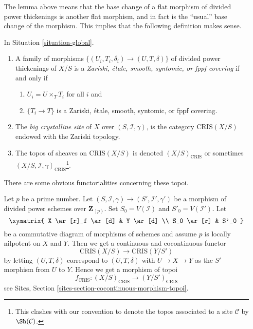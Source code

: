 \noindent
The lemma above means that the base change of a flat morphism
of divided power thickenings is another flat morphism, and in
fact is the ``usual'' base change of the morphism. This implies
that the following definition makes sense.

\begin{definition}
\label{definition-big-crystalline-site}
In Situation \ref{situation-global}.
\begin{enumerate}
\item A family of morphisms $\{(U_i, T_i, \delta_i) \to (U, T, \delta)\}$
of divided power thickenings of $X/S$ is a
{\it Zariski, \'etale, smooth, syntomic, or fppf covering}
if and only if
\begin{enumerate}
\item $U_i = U \times_T T_i$ for all $i$ and
\item $\{T_i \to T\}$ is a Zariski, \'etale, smooth, syntomic, or fppf covering.
\end{enumerate}
\item The {\it big crystalline site} of $X$ over $(S, \mathcal{I}, \gamma)$,
is the category $\text{CRIS}(X/S)$ endowed with the Zariski topology.
\item The topos of sheaves on $\text{CRIS}(X/S)$ is denoted
$(X/S)_{\text{CRIS}}$ or sometimes
$(X/S, \mathcal{I}, \gamma)_{\text{CRIS}}$\footnote{This clashes with
our convention to denote the topos associated to a site $\mathcal{C}$
by $\Sh(\mathcal{C})$.}.
\end{enumerate}
\end{definition}

\noindent
There are some obvious functorialities concerning these topoi.

\begin{remark}[Functoriality]
\label{remark-functoriality-big-cris}
Let $p$ be a prime number.
Let $(S, \mathcal{I}, \gamma) \to (S', \mathcal{I}', \gamma')$ be a
morphism of divided power schemes over $\mathbf{Z}_{(p)}$.
Set $S_0 = V(\mathcal{I})$ and $S'_0 = V(\mathcal{I}')$.
Let
$$
\xymatrix{
X \ar[r]_f \ar[d] & Y \ar[d] \\
S_0 \ar[r] & S'_0
}
$$
be a commutative diagram of morphisms of schemes and assume $p$ is
locally nilpotent on $X$ and $Y$. Then we get a continuous and
cocontinuous functor
$$
\text{CRIS}(X/S) \longrightarrow \text{CRIS}(Y/S')
$$
by letting $(U, T, \delta)$ correspond to $(U, T, \delta)$
with $U \to X \to Y$ as the $S'$-morphism from $U$ to $Y$.
Hence we get a morphism of topoi
$$
f_{\text{CRIS}} : (X/S)_{\text{CRIS}} \longrightarrow (Y/S')_{\text{CRIS}}
$$
see Sites, Section \ref{sites-section-cocontinuous-morphism-topoi}.
\end{remark}

